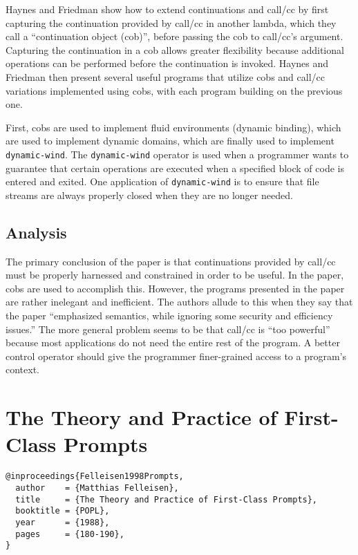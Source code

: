 \documentclass[letterpaper]{llncs}
\begin{document}
Haynes and Friedman show how to extend continuations and call/cc by first capturing the continuation provided by call/cc in another lambda, which they call a ``continuation object (cob)'', before passing the cob to call/cc's argument. Capturing the continuation in a cob allows greater flexibility because additional operations can be performed before the continuation is invoked. Haynes and Friedman then present several useful programs that utilize cobs and call/cc variations implemented using cobs, with each program building on the previous one. 

First, cobs are used to implement fluid environments (dynamic binding), which are used to implement dynamic domains, which are finally used to implement \texttt{dynamic-wind}. The \texttt{dynamic-wind} operator is used when a programmer wants to guarantee that certain operations are executed when a specified block of code is entered and exited. One application of \texttt{dynamic-wind} is to ensure that file streams are always properly closed when they are no longer needed.

\subsection*{Analysis}

The primary conclusion of the paper is that continuations provided by call/cc must be properly harnessed and constrained in order to be useful. In the paper, cobs are used to accomplish this. However, the programs presented in the paper are rather inelegant and inefficient. The authors allude to this when they say that the paper ``emphasized semantics, while ignoring some security and efficiency issues.'' The more general problem seems to be that call/cc is ``too powerful'' because most applications do not need the entire rest of the program. A better control operator should give the programmer finer-grained access to a program's context.


\section*{The Theory and Practice of First-Class Prompts}%

\begin{verbatim}
@inproceedings{Felleisen1998Prompts,
  author    = {Matthias Felleisen},
  title     = {The Theory and Practice of First-Class Prompts},
  booktitle = {POPL},
  year      = {1988},
  pages     = {180-190},
}
\end{verbatim}
\end{document}
